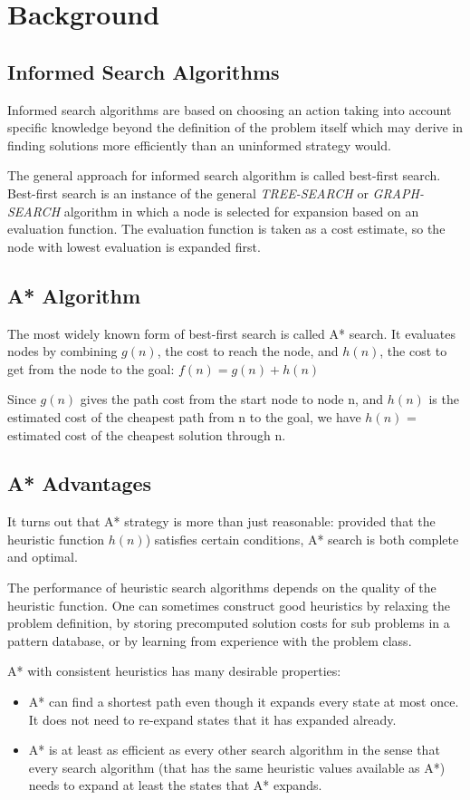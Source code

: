 \chapter{Background}
\setlength{\parskip}{1em}
\section{Informed Search Algorithms}
Informed search algorithms are based on choosing an action taking into account specific knowledge beyond the definition of the problem itself which may derive in finding solutions more efficiently than an uninformed strategy would.

The general approach for informed search algorithm is called best-first search. Best-first search is an instance of the general {\textit{TREE-SEARCH}} or {\textit{GRAPH-SEARCH}} algorithm in which a node is selected for expansion based on an evaluation function.  The evaluation function is taken as a cost estimate, so the node with lowest evaluation is expanded first. 

\section{A* Algorithm}
The most widely known form of best-first search is called A* search. It evaluates nodes by combining \(g(n)\), the cost to reach the node, and \(h(n)\), the cost to get from the node to the goal: 
\(f(n)=g(n) + h(n)\)

Since \(g(n)\) gives the path cost from the start node to node n, and \(h(n)\) is the estimated cost of the cheapest path from n to the goal, we have
\(h(n)\) = estimated cost of the cheapest solution through n.

\section{A* Advantages}
It turns out that A* strategy is more than just reasonable: provided that the heuristic function \(h(n)\)) satisfies certain conditions, A* search is both complete and optimal.

The performance of heuristic search algorithms depends on the quality of the heuristic function. One can sometimes construct good heuristics by relaxing the problem definition, by storing precomputed solution costs for sub problems in a pattern database, or by learning from experience with the problem class.

A* with consistent heuristics has many desirable properties\cite[p.~50]{elsevier12}: 

\begin{itemize}
  \item A* can find a shortest path even though it expands every state at most once. It does not need to re-expand states that it has expanded already. 
  \item A* is at least as efficient as every other search algorithm in the sense that every search algorithm (that has the same heuristic values available as A*) needs to expand at least the states that A* expands. 
\end{itemize}
